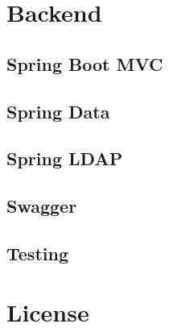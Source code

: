 \section{Backend}
\subsection{Spring Boot MVC}
\subsection{Spring Data}
\subsection{Spring LDAP}
\subsection{Swagger}
\subsection{Testing}

\section{License}
